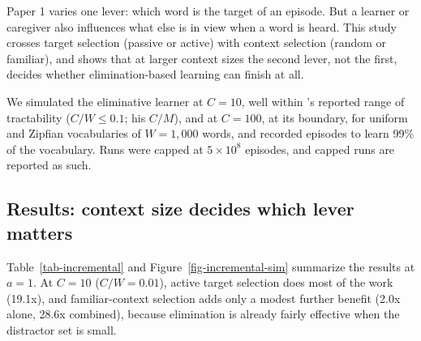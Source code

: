 \documentclass[a4paper,natbib,man]{apa6}
\begin{document}
Paper 1 varies one lever: which word is the target of an episode. But a learner or caregiver also influences what else is in view when a word is heard. This study crosses target selection (passive or active) with context selection (random or familiar), and shows that at larger context sizes the second lever, not the first, decides whether elimination-based learning can finish at all.

We simulated the eliminative learner at $C=10$, well within \cite{Vogt:2012}'s reported range of tractability ($C/W \le 0.1$; his $C/M$), and at $C=100$, at its boundary, for uniform and Zipfian vocabularies of $W=1{,}000$ words, and recorded episodes to learn 99\% of the vocabulary. Runs were capped at $5 \times 10^8$ episodes, and capped runs are reported as such.

\subsection{Results: context size decides which lever matters}
Table~\ref{tab-incremental} and Figure~\ref{fig-incremental-sim} summarize the results at $a=1$. At $C=10$ ($C/W=0.01$), active target selection does most of the work (19.1x), and familiar-context selection adds only a modest further benefit (2.0x alone, 28.6x combined), because elimination is already fairly effective when the distractor set is small.
\end{document}
